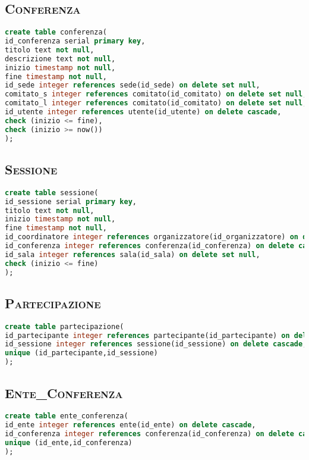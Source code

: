 \subsection{\textsc{Conferenza}}
\begin{lstlisting}[language=SQL,style=mystyle]
create table conferenza(
id_conferenza serial primary key,
titolo text not null,
descrizione text not null,
inizio timestamp not null,
fine timestamp not null,
id_sede integer references sede(id_sede) on delete set null,
comitato_s integer references comitato(id_comitato) on delete set null,
comitato_l integer references comitato(id_comitato) on delete set null,
id_utente integer references utente(id_utente) on delete cascade,
check (inizio <= fine), 
check (inizio >= now()) 
);
\end{lstlisting}
\subsection{\textsc{Sessione}}
\begin{lstlisting}[language=SQL,style=mystyle]
create table sessione(
id_sessione serial primary key,
titolo text not null,
inizio timestamp not null,
fine timestamp not null,
id_coordinatore integer references organizzatore(id_organizzatore) on delete set null,
id_conferenza integer references conferenza(id_conferenza) on delete cascade,
id_sala integer references sala(id_sala) on delete set null,
check (inizio <= fine)
);
\end{lstlisting}
\subsection{\textsc{Partecipazione}}
\begin{lstlisting}[language=SQL,style=mystyle]
create table partecipazione(
id_partecipante integer references partecipante(id_partecipante) on delete cascade,
id_sessione integer references sessione(id_sessione) on delete cascade,
unique (id_partecipante,id_sessione) 
);
\end{lstlisting}
\subsection{\textsc{Ente\_Conferenza}}
\begin{lstlisting}[language=SQL,style=mystyle]
create table ente_conferenza(
id_ente integer references ente(id_ente) on delete cascade,
id_conferenza integer references conferenza(id_conferenza) on delete cascade,
unique (id_ente,id_conferenza)
);
\end{lstlisting}
